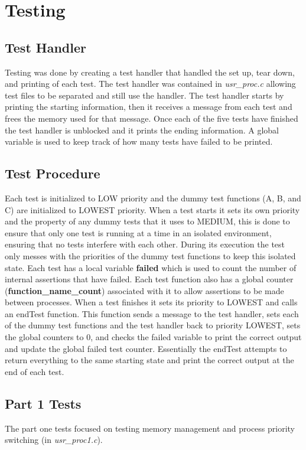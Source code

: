 \documentclass[11pt, oneside]{article}
\begin{document}
\section{Testing}

\subsection{Test Handler}
Testing was done by creating a test handler that handled the set up, tear down, and printing of each test. The test handler was contained in \textit{usr\_proc.c} allowing test files to be separated and still use the handler. The test handler starts by printing the starting information, then it receives a message from each test and frees the memory used for that message. Once each of the five tests have finished the test handler is unblocked and it prints the ending information. A global variable is used to keep track of how many tests have failed to be printed.

\subsection{Test Procedure} Each test is initialized to LOW priority and the dummy test functions (A, B, and C) are initialized to LOWEST priority. When a test starts it sets its own priority and the property of any dummy tests that it uses to MEDIUM, this is done to ensure that only one test is running at a time in an isolated environment, ensuring that no tests interfere with each other. During its execution the test only messes with the priorities of the dummy test functions to keep this isolated state. Each test has a local variable \textbf{failed} which is used to count the number of internal assertions that have failed. Each test function also has a global counter (\textbf{function\_name\_count}) associated with it to allow assertions to be made between processes. When a test finishes it sets its priority to LOWEST and calls an endTest function. This function sends a message to the test handler, sets each of the dummy test functions and the test handler back to priority LOWEST, sets the global counters to 0, and checks the failed variable to print the correct output and update the global failed test counter. Essentially the endTest attempts to return everything to the same starting state and print the correct output at the end of each test.

\subsection{Part 1 Tests}
The part one tests focused on testing memory management and process priority switching (in \textit{usr\_proc1.c}).
\end{document}
